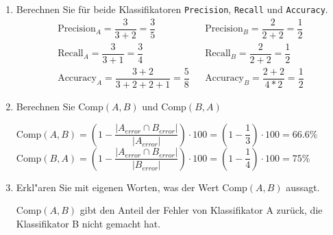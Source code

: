 \documentclass[10pt, oneside]{article}
\begin{document}
\begin{enumerate}[1.]
    \item Berechnen Sie für beide Klassifikatoren \verb|Precision|, \verb|Recall| und \verb|Accuracy|.
        \begin{equation*}
            \begin{array}{rcl}
                \text{Precision}_A = \dfrac{3}{3 + 2}             = \dfrac{3}{5} & & \text{Precision}_B   = \dfrac{2}{2 + 2}     = \dfrac{1}{2} \\[15pt]
                \text{Recall}_A    = \dfrac{3}{3 + 1}             = \dfrac{3}{4} & & \text{Recall}_B      = \dfrac{2}{2 + 2}     = \dfrac{1}{2} \\[15pt]
                \text{Accuracy}_A  = \dfrac{3 + 2}{3 + 2 + 2 + 1} = \dfrac{5}{8} & & \text{Accuracy}_B    = \dfrac{2 + 2}{4 * 2} = \dfrac{1}{2}
            \end{array}
        \end{equation*}

    \item Berechnen Sie $\text{Comp}(A, B)$ und $\text{Comp}(B, A)$

        $\text{Comp}(A, B) = (1 - \dfrac{|A_{error} \cap B_{error}|}{|A_{error}|}) \cdot 100 = (1 - \dfrac{1}{3}) \cdot 100 = 66.6\%$ \\[10pt]
        $\text{Comp}(B, A) = (1 - \dfrac{|A_{error} \cap B_{error}|}{|B_{error}|}) \cdot 100 = (1 - \dfrac{1}{4}) \cdot 100 = 75\%$

    \item Erkl"aren Sie mit eigenen Worten, was der Wert $\text{Comp}(A, B)$ aussagt.

        $\text{Comp}(A, B)$ gibt den Anteil der Fehler von Klassifikator A
        zurück, die Klassifikator B nicht gemacht hat.
\end{enumerate}
\end{document}
